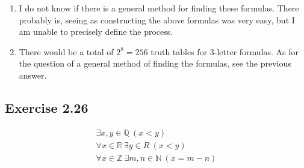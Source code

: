 \documentclass[leqno]{article}
\begin{document}
\begin{enumerate}
\begin{table}
\begin{tabular}{ll}
\begin{tabular}{|cc|c|}
        \hline
        $P$ & $Q$ & $\Phi$ \\
        \hline
         t  &  t  &    t   \\
         t  &  f  &    t   \\
         f  &  t  &    f   \\
         f  &  f  &    t   \\
        \hline
      \end{tabular}
      \quad $\Phi := P \lor \neg Q$
      \\
      \begin{tabular}{|cc|c|}
        \hline
        $P$ & $Q$ & $\Phi$ \\
        \hline
         t  &  t  &    t   \\
         t  &  f  &    t   \\
         f  &  t  &    t   \\
         f  &  f  &    f   \\
        \hline
      \end{tabular}
      \quad $\Phi := P \lor Q$
      &
      \begin{tabular}{|cc|c|}
        \hline
        $P$ & $Q$ & $\Phi$ \\
        \hline
         t  &  t  &    t   \\
         t  &  f  &    t   \\
         f  &  t  &    t   \\
         f  &  f  &    t   \\
        \hline
      \end{tabular}
      \quad $\Phi := P \lor \neg P$
  \end{tabular}
  \caption{The 16 truth tables for 2-letter formulas}
  \label{tab:2letterformulas}
  \end{table}

  \item
  I do not know if there is a general method for finding these formulas.
  There probably is, seeing as constructing the above formulas was very easy,
  but I am unable to precisely define the process.

  \item
  There would be a total of $2^8 = 256$ truth tables for 3-letter formulas.
  As for the question of a general method of finding the formulas, see the previous
  answer.
\end{enumerate}

\subsection*{Exercise 2.26}
\setcounter{equation}{0}
\begin{gather}
  \exists x,y \in \mathbb{Q} ~ (x < y)
  \\
  \forall x \in \mathbb{R} ~ \exists y \in {R} ~ (x < y)
  \\
  \forall x \in \mathbb{Z} ~ \exists m,n \in \mathbb{N} ~ (x = m - n)
\end{gather}
\end{document}
